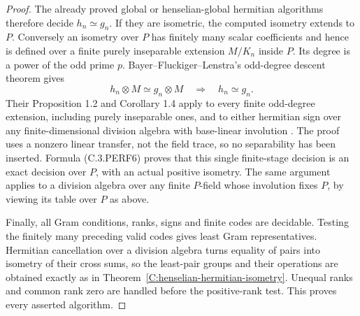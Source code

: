 \begin{proof}
The already proved global or henselian-global hermitian algorithms
therefore decide $h_n\simeq g_n$.  If they are isometric, the
computed isometry extends to $P$.  Conversely an isometry over $P$
has finitely many scalar coefficients and hence is defined over a
finite purely inseparable extension $M/K_n$ inside $P$.  Its degree
is a power of the odd prime $p$.  Bayer--Fluckiger--Lenstra's
odd-degree descent theorem gives
\[
 h_n\otimes M\simeq g_n\otimes M
                 \quad\Longrightarrow\quad h_n\simeq g_n.
                                                               \tag{C.3.PERF6}
\]
Their Proposition 1.2 and Corollary 1.4 apply to every finite
odd-degree extension, including purely inseparable ones, and to
either hermitian sign over any finite-dimensional division algebra
with base-linear involution
\cite[pp.362--363]{C-BayerLenstraOddDegree1990}.
The proof uses a nonzero linear transfer, not the field trace, so
no separability has been inserted.  Formula (C.3.PERF6) proves that
this single finite-stage decision is an exact decision over $P$,
with an actual positive isometry.  The same argument applies to a
division algebra over any finite $P$-field whose involution fixes
$P$, by viewing its table over $P$ as above.

Finally, all Gram conditions, ranks, signs and finite codes are
decidable.  Testing the finitely many preceding valid codes gives
least Gram representatives.  Hermitian cancellation over a division
algebra turns equality of pairs into isometry of their cross sums,
so the least-pair groups and their operations are obtained exactly
as in Theorem~\ref{C:henselian-hermitian-isometry}.  Unequal ranks
and common rank zero are handled before the positive-rank test.
This proves every asserted algorithm.
\end{proof}


